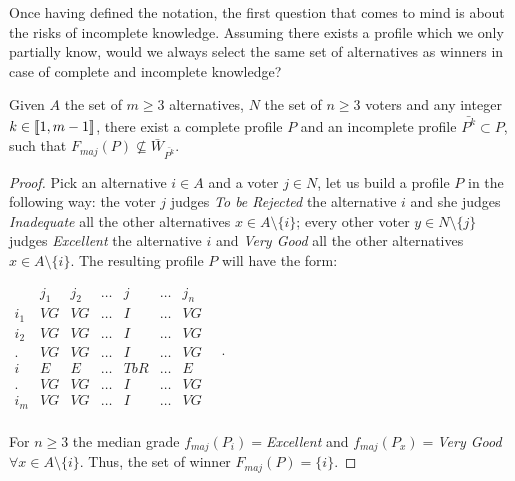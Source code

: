 \documentclass[version=3.21, pagesize, twoside=off, bibliography=totoc, DIV=calc, fontsize=12pt, a4paper]{scrartcl}
\begin{document}
Once having defined the notation, the first question that comes to mind is about the risks of incomplete knowledge. Assuming there exists a profile which we only partially know, would we always select the same set of alternatives as winners in case of complete and incomplete knowledge?

\begin{proposition}
	\label{prop:notsamewinner}
	Given $A$ the set of $m\geq 3$ alternatives, $N$ the set of $n\geq3$ voters and any integer $k \in \llbracket1,m-1\rrbracket$, there exist a complete profile $P$ and an incomplete profile $\bar{P^k} \subset P$, such that $F_{maj}(P) \nsubseteq \bar{W}_{\bar{P^k}}$.
\end{proposition}
\begin{proof}
	Pick an alternative $i\in A$ and a voter $j \in N$, let us build a profile $P$ in the following way: the voter $j$ judges \textit{To be Rejected} the alternative $i$ and she judges \textit{Inadequate} all the other alternatives $x \in A \setminus \{i\}$; every other voter $y\in N \setminus \{j\}$ judges \textit{Excellent} the alternative $i$ and \textit{Very Good} all the other alternatives $x \in A \setminus \{i\}$. The resulting profile $P$ will have the form:
	\begin{center}
		$
		\begin{array}{ccccccc}
			& j_1 & j_2 & \dots & j & \dots & j_n \\
			i_1 &	VG & VG & \dots & I & \dots & VG \\
			i_2 &	VG & VG & \dots & I & \dots & VG \\
			. &	VG & VG & \dots & I & \dots & VG \\
			i &	E & E & \dots & TbR & \dots & E \\
			. &	VG & VG & \dots & I & \dots & VG \\
			i_m &	VG & VG & \dots & I & \dots & VG \\
		\end{array} \quad.
		$
	\end{center}
	For $n\geq 3$ the median grade $f_{maj}(P_i)=$\textit{Excellent} and $f_{maj}(P_x)=$\textit{Very Good} $\forall x \in A \setminus \{i\}$. Thus, the set of winner $F_{maj}(P)=\{i\}$.
	

\end{proof}
\end{document}
